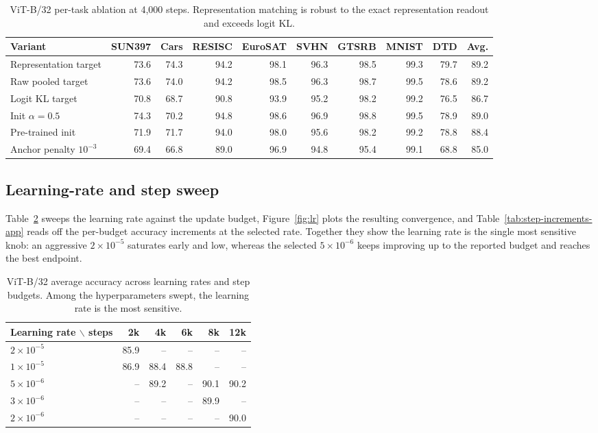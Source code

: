 \documentclass[letterpaper]{article} %
\theoremstyle{plain}
\theoremstyle{definition}
\begin{document}
\begin{table}[tb]
\centering
{\small
\begin{tabular*}{\textwidth}{@{\extracolsep{\fill}}lrrrrrrrrr}
\toprule
Variant & SUN397 & Cars & RESISC & EuroSAT & SVHN & GTSRB & MNIST & DTD & Avg. \\
\midrule
Representation target & 73.6 & 74.3 & 94.2 & 98.1 & 96.3 & 98.5 & 99.3 & 79.7 & 89.2 \\
Raw pooled target & 73.6 & 74.0 & 94.2 & 98.5 & 96.3 & 98.7 & 99.5 & 78.6 & 89.2 \\
Logit KL target & 70.8 & 68.7 & 90.8 & 93.9 & 95.2 & 98.2 & 99.2 & 76.5 & 86.7 \\
Init $\alpha=0.5$ & 74.3 & 70.2 & 94.8 & 98.6 & 96.9 & 98.8 & 99.5 & 78.9 & 89.0 \\
Pre-trained init & 71.9 & 71.7 & 94.0 & 98.0 & 95.6 & 98.2 & 99.2 & 78.8 & 88.4 \\
Anchor penalty $10^{-3}$ & 69.4 & 66.8 & 89.0 & 96.9 & 94.8 & 95.4 & 99.1 & 68.8 & 85.0 \\
\bottomrule
\end{tabular*}
}
\caption{ViT-B/32 per-task ablation at 4,000 steps. Representation matching is robust to
the exact representation readout and exceeds logit KL.}
\label{tab:ablation-full}
\end{table}

\subsection{Learning-rate and step sweep}
\label{app:learning-rate}
Table~\ref{tab:lr-grid} sweeps the learning rate against the update budget, Figure~\ref{fig:lr} plots the resulting convergence, and Table~\ref{tab:step-increments-app} reads off the per-budget accuracy increments at the selected rate.
Together they show the learning rate is the single most sensitive knob: an aggressive $2\times10^{-5}$ saturates early and low, whereas the selected $5\times10^{-6}$ keeps improving up to the reported budget and reaches the best endpoint.

\begin{table}[tb]
\centering
{\small
\begin{tabular}{lrrrrr}
\toprule
Learning rate $\backslash$ steps & 2k & 4k & 6k & 8k & 12k \\
\midrule
$2\times10^{-5}$ & 85.9 & -- & -- & -- & -- \\
$1\times10^{-5}$ & 86.9 & 88.4 & 88.8 & -- & -- \\
$5\times10^{-6}$ & -- & 89.2 & -- & 90.1 & 90.2 \\
$3\times10^{-6}$ & -- & -- & -- & 89.9 & -- \\
$2\times10^{-6}$ & -- & -- & -- & -- & 90.0 \\
\bottomrule
\end{tabular}
}
\caption{ViT-B/32 average accuracy across learning rates and step budgets. Among the
hyperparameters swept, the learning rate is the most sensitive.}
\label{tab:lr-grid}
\end{table}
\end{document}

